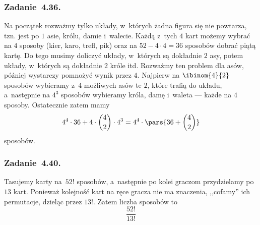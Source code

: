 \subsubsection*{Zadanie~4.36.}
Na początek rozważmy tylko układy, w~których żadna figura się nie powtarza, tzn. jest po \(1\) asie, królu, damie i~walecie. Każdą z~tych \(4\) kart możemy wybrać na \(4\) sposoby (kier, karo, trefl, pik) oraz na \(52 - 4 \cdot 4 = 36\) sposobów dobrać piątą kartę. Do tego musimy doliczyć układy, w~których są dokładnie \(2\) asy, potem układy, w~których są dokładnie \(2\) króle itd. Rozważmy ten problem dla asów, później wystarczy pomnożyć wynik przez \(4\). Najpierw na \(\ibinom{4}{2}\) sposobów wybieramy z~\(4\) możliwych asów te \(2\), które trafią do układu, a~następnie na \(4^3\) sposobów wybieramy króla, damę i~waleta --- każde na \(4\) sposoby. Ostatecznie zatem mamy
\begin{equation*}
    4^4 \cdot 36 + 4 \cdot \binom{4}{2} \cdot 4^3
        = 4^4 \cdot \pars{36 + \binom{4}{2}}
\end{equation*}
sposobów.
\subsubsection*{Zadanie~4.40.}
Tasujemy karty na~\(52!\) sposobów, a~następnie po kolei graczom przydzielamy po \(13\) kart. Ponieważ kolejność kart na ręce gracza nie ma znaczenia, ,,cofamy'' ich permutacje, dzieląc przez \(13!\). Zatem liczba sposobów to
\begin{equation*}
    \frac{52!}{13!}
\end{equation*}
